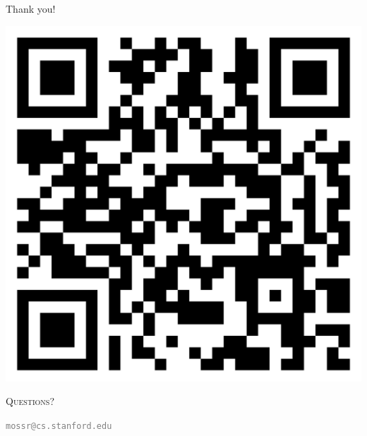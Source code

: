 \begin{frame}[fragile]{Thank you!}

\centering

\includegraphics[width=0.25\linewidth]{media/qr-code.png}

\phantom{---}

\Large
\textsc{Questions?}

\textcolor{gray}{\small\texttt{mossr@cs.stanford.edu}}
    
\end{frame}